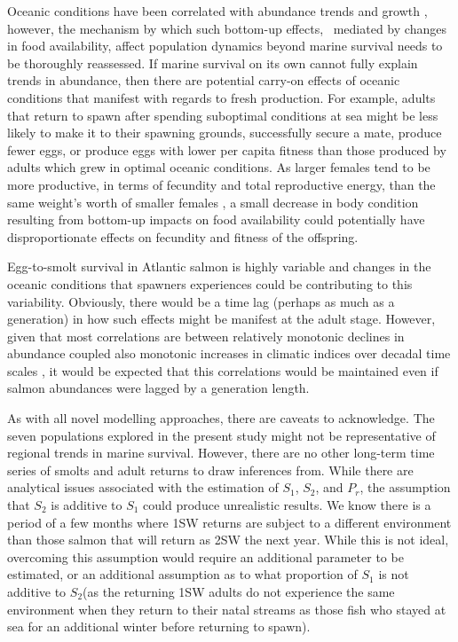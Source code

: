 \documentclass[12pt]{article}
\newcommand{\So}{$S_{1}$\xspace}
\newcommand{\St}{$S_{2}$\xspace}
\newcommand{\Pg}{$P_r$\xspace}
\begin{document}
Oceanic conditions have been correlated with abundance trends and growth
\citep{Todd2008}, however, the mechanism by which such bottom-up effects, \
mediated by changes in food availability,
affect population dynamics beyond marine survival needs to
be thoroughly reassessed. If marine survival on its own cannot fully explain
trends in abundance, then there are potential carry-on effects of oceanic
conditions that manifest with regards to fresh production. 
For example, adults
that return to spawn after spending suboptimal conditions at sea might be less
likely to make it to their spawning grounds, successfully secure a mate,
produce fewer eggs, or produce eggs with lower per capita fitness than those
produced by adults which grew in optimal oceanic conditions.
As larger females tend to be more productive, in terms of fecundity and total
reproductive energy, than the same weight's worth of smaller females
\citep{Barneche2018}, a small decrease in body condition resulting from bottom-up
impacts on food availability could potentially have disproportionate effects on fecundity
and fitness of the offspring.

Egg-to-smolt survival in Atlantic salmon is highly variable \citep{Chaput2015}
and changes in the oceanic conditions that spawners experiences could be
contributing to this variability.
Obviously, there would be a time lag (perhaps as much as a generation) in how such effects
might be manifest at the adult stage.
However, given that most correlations are between relatively monotonic declines
in abundance coupled also monotonic increases in climatic indices
over decadal time scales \citep[e.g.,][]{Friedland1998, Todd2008,
    Beaugrand2012}, it would be expected that this correlations would be
maintained even if salmon abundances were lagged by a generation length.


As with all novel modelling approaches, there are caveats to acknowledge.
The seven populations explored in the present study might not be representative
of regional trends in marine survival. However, there are no other
long-term time series of smolts and adult returns to draw inferences from.
While there are analytical issues associated with the estimation of \So, \St, and \Pg,
the assumption that \St is additive to \So could produce unrealistic results.
We know there is a period of a few months where 1SW
returns are subject to a different environment than those salmon that will
return as 2SW the next year. 
While this is not ideal,
overcoming this assumption would require an additional parameter to be
estimated, or an additional assumption as to what proportion of \So is not
additive to \St (as the returning 1SW adults do not experience the same
environment when they return to their natal streams as those fish who stayed
at sea for an additional winter before returning to spawn).
\end{document}
